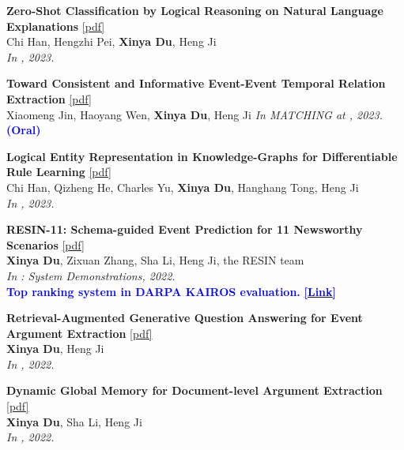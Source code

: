 \begin{enumerate}[{[}1{]},leftmargin=*]
\item 
{\bf Zero-Shot Classification by Logical Reasoning on Natural Language Explanations} 
\href{https://aclanthology.org/2023.findings-acl.571.pdf}{{[pdf]}} \\
Chi Han, Hengzhi Pei, \textbf{Xinya Du}, Heng Ji \\
{\it In \ACLfinding, 2023.}\\

\item 
{\bf Toward Consistent and Informative Event-Event Temporal Relation Extraction} 
\href{https://aclanthology.org/2023.matching-1.3.pdf}{{[pdf]}} \\
Xiaomeng Jin, Haoyang Wen, \textbf{Xinya Du}, Heng Ji
{\it In MATCHING at \ACL, 2023.} {\textcolor{blue}{\textbf{(Oral)}}} \\ 

\item 
{\bf Logical Entity Representation in Knowledge-Graphs for Differentiable Rule Learning} 
\href{https://openreview.net/pdf?id=JdgO-ht1uTN}{{[pdf]}} \\
Chi Han, Qizheng He, Charles Yu, \textbf{Xinya Du}, Hanghang Tong, Heng Ji\\
{\it In \ICLR, 2023.}\\

\item
{\bf RESIN-11: Schema-guided Event Prediction for 11 Newsworthy Scenarios} 
\href{https://aclanthology.org/2022.naacl-demo.7.pdf}{{[pdf]}} \\
{\bf Xinya Du}, Zixuan Zhang, Sha Li, Heng Ji, the RESIN team \\
{\it In \NAACL: System Demonstrations, 2022.} \\
{\textcolor{blue}{\textbf{Top ranking system in DARPA KAIROS evaluation.}}} 
\href{https://www.darpa.mil/program/knowledge-directed-artificial-intelligence-reasoning-over-schemas}{\textcolor{blue}{\textbf{[Link]}}} \\ 


\item 
{\bf Retrieval-Augmented Generative Question Answering for Event Argument Extraction} 
\href{https://aclanthology.org/2022.emnlp-main.307.pdf}{{[pdf]}} \\
{\bf Xinya Du}, Heng Ji \\
{\it In \EMNLP, 2022.}\\


\item
{\bf Dynamic Global Memory for Document-level Argument Extraction} 
\href{https://aclanthology.org/2022.acl-long.361.pdf}{{[pdf]}} \\
{\bf Xinya Du}, Sha Li, Heng Ji \\
{\it In \ACL, 2022.}\\


\end{enumerate}
